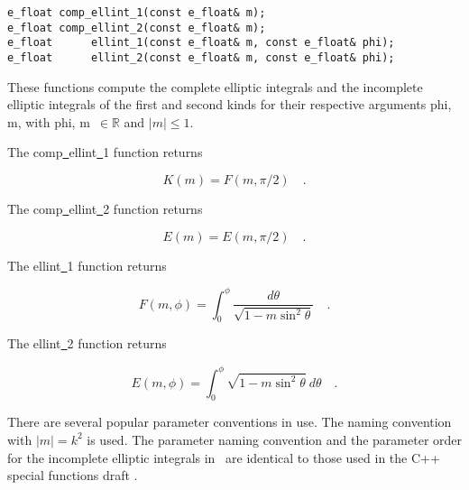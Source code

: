 \begin{lstlisting}
e_float comp_ellint_1(const e_float& m);
e_float comp_ellint_2(const e_float& m);
e_float      ellint_1(const e_float& m, const e_float& phi);
e_float      ellint_2(const e_float& m, const e_float& phi);
\end{lstlisting}

\vspace{6.0pt}

 These functions compute the complete elliptic integrals
and the incomplete elliptic integrals of the first and second kinds
for their respective arguments
{\courier phi}, {\courier m},
with {\courier phi}, {\courier m}~$\in\mathbb{R}$ and $|m| \leq 1$.

\vspace{6.0pt}

 The {\courier comp\underline\ ellint\underline\ 1} function
returns~\cite{wolframfunctions:website}

\begin{equation}
K(m) = F(m, \pi/2)\quad .
\end{equation}

 The {\courier comp\underline\ ellint\underline\ 2} function
returns~\cite{wolframfunctions:website}

\begin{equation}
E(m) = E(m, \pi/2)\quad .
\end{equation}

 The {\courier ellint\underline\ 1} function
returns~\cite{wolframfunctions:website}

\begin{equation}
F(m, \phi) = \int_{0}^{\phi} \frac{d\theta}{\sqrt{1 - m \sin^2\theta}}\quad .
\end{equation}

 The {\courier ellint\underline\ 2} function
returns~\cite{wolframfunctions:website}

\begin{equation}
E(m, \phi) = \int_{0}^{\phi} \sqrt{1 - m \sin^2\theta} \ d\theta\quad .
\end{equation}

\vspace{6.0pt}

 There are several popular parameter conventions in use.
The naming convention with $|m| = k^2$ is used. The parameter naming convention
and the parameter order for the incomplete elliptic integrals in \efloat\
are identical to those used in the C++ special functions
draft \cite{isoiec29123:textbook}.

